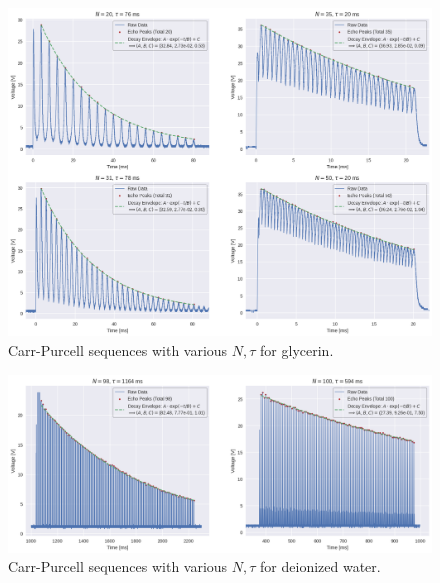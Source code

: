 \documentclass[
    floatfix,  %
    reprint,
    amsmath,
    amssymb,
    aps,
]{revtex4-2}
\begin{document}
\begin{figure}[htbp]
    \centering
    \includegraphics[width=\textwidth]{figs/purcell/glycerin.png}
    \caption{Carr-Purcell sequences with various $N, \tau$ for glycerin.}
    \label{fig:purcell/glycerin}
\end{figure}

\begin{figure}[htbp]
    \centering
    \includegraphics[width=\textwidth]{figs/purcell/water.png}
    \caption{Carr-Purcell sequences with various $N, \tau$ for deionized water.}
    \label{fig:purcell/water}
\end{figure}


\twocolumngrid



















\end{document}
